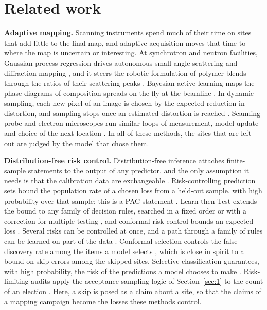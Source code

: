 \documentclass{iopjournal}
\begin{document}
\hypertarget{sec:2}{%
\section{Related work}\label{sec:2}}

\textbf{Adaptive mapping.} Scanning instruments spend much of their time on sites that add little to the final map, and adaptive acquisition moves that time to where the map is uncertain or interesting. At synchrotron and neutron facilities, Gaussian-process regression drives autonomous small-angle scattering and diffraction mapping \cite{Noack2019,Noack2020,Noack2021}, and it steers the robotic formulation of polymer blends through the ratios of their scattering peaks \cite{Upreti2026}. Bayesian active learning maps the phase diagrams of composition spreads on the fly at the beamline \cite{Kusne2020}. In dynamic sampling, each new pixel of an image is chosen by the expected reduction in distortion, and sampling stops once an estimated distortion is reached \cite{Godaliyadda2018}. Scanning probe and electron microscopes run similar loops of measurement, model update and choice of the next location \cite{Kalinin2021,Ziatdinov2022}. In all of these methods, the sites that are left out are judged by the model that chose them.

\textbf{Distribution-free risk control.} Distribution-free inference attaches finite-sample statements to the output of any predictor, and the only assumption it needs is that the calibration data are exchangeable \cite{Vovk2005,Angelopoulos2023}. Risk-controlling prediction sets bound the population rate of a chosen loss from a held-out sample, with high probability over that sample; this is a PAC statement \cite{Bates2021,Park2020}. Learn-then-Test extends the bound to any family of decision rules, searched in a fixed order or with a correction for multiple testing \cite{Angelopoulos2025}, and conformal risk control bounds an expected loss \cite{Angelopoulos2024}. Several risks can be controlled at once, and a path through a family of rules can be learned on part of the data \cite{LauferGoldshtein2023}. Conformal selection controls the false-discovery rate among the items a model selects \cite{Jin2023}, which is close in spirit to a bound on skip errors among the skipped sites. Selective classification guarantees, with high probability, the risk of the predictions a model chooses to make \cite{Geifman2017}. Risk-limiting audits apply the acceptance-sampling logic of Section~\ref{sec:1} to the count of an election \cite{LindemanStark2012}. Here, a skip is posed as a claim about a site, so that the claims of a mapping campaign become the losses these methods control.
\end{document}
